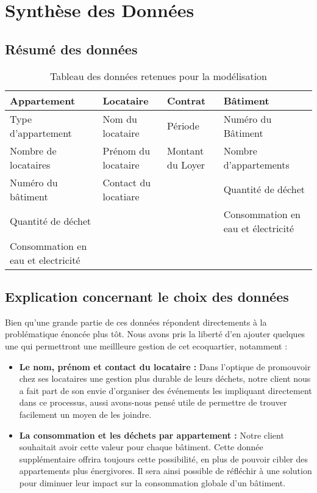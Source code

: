 \chapter{Synthèse des Données}

\section{Résumé des données}

\begin{table}[h]
\centering
\begin{tabularx}{\textwidth}{|X|X|X|X|}
\hline
\textbf{Appartement} & \textbf{Locataire} & \textbf{Contrat} & \textbf{Bâtiment}\\
\hline
Type d'appartement & Nom du locataire & Période & Numéro du Bâtiment \\
\hline
Nombre de locataires & Prénom du locataire & Montant du Loyer & Nombre d'appartements \\
\hline
Numéro du bâtiment & Contact du locatiare & & Quantité de déchet \\
\hline
Quantité de déchet & & & Consommation en eau et électricité \\
\hline
Consommation en eau et electricité & & & \\
\hline
\end{tabularx}
\caption{Tableau des données retenues pour la modélisation}
\end{table}

\section{Explication concernant le choix des données}

Bien qu'une grande partie de ces données répondent directements à la problématique énoncée plus tôt. Nous avons pris la liberté d'en ajouter quelques une qui permettront une meillleure gestion de cet ecoquartier, notamment :
\begin{itemize}
\item \textbf{Le nom, prénom et contact du locataire :} Dans l'optique de promouvoir chez ses locataires une gestion plus durable de leurs déchets, notre client nous a fait part de son envie d'organiser des événements les impliquant directement dans ce processus, aussi avons-nous pensé utile de permettre de trouver facilement un moyen de les joindre.
\item \textbf{La consommation et les déchets par appartement :} Notre client souhaitait avoir cette valeur pour chaque bâtiment. Cette donnée supplémentaire offrira toujours cette possibilité, en plus de pouvoir cibler des appartements plus énergivores. Il sera ainsi possible de réfléchir à une solution pour diminuer leur impact sur la consommation globale d'un bâtiment.
\end{itemize}

